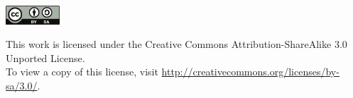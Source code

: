 \begin{center}
  \includegraphics[width=2cm]{images/by-sa.pdf}
  
  \scriptsize This work is licensed under the Creative Commons
  Attribution-ShareAlike 3.0 Unported License.\\ To view a copy
  of this license, visit
  \url{http://creativecommons.org/licenses/by-sa/3.0/}.
\end{center}


